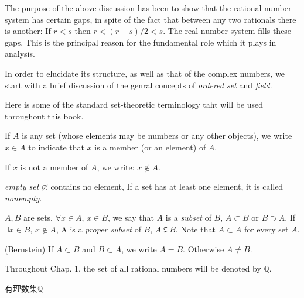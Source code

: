 \begin{myRemark}\label{Remark:1.2}
The purpose of the above discussion has been to show that the rational number system has certain gaps, 
in spite of the fact that between any two rationals there is another: If $r<s$ then $r<(r+s)/2<s$.
The real number system fills these gaps.
This is the principal reason for the fundamental role which it plays in analysis.
\end{myRemark}


In order to elucidate its structure, as well as that of the complex numbers, 
we start with a brief discussion of the genral concepts of \emph{ordered set} and \emph{field}.



Here is some of the standard set-theoretic terminology taht will be used throughout this book.


\begin{myDef}\label{myDef:1.3}
If $A$ is any set (whose elements may be numbers or any other objects), we write $x\in A$ to indicate that $x$ is a member (or an element) of $A$.


If $x$ is not a member of $A$, we write: $x\notin A$.

\emph{empty set} $\varnothing$ contains no element, If a set has at least one element, it is called \emph{nonempty}.

$A,B$ are sets, $\forall x\in A$, $x\in B$, we say that $A$ is a \emph{subset} of $B$, $A\subset B$ or $B\supset A$. If $\exists x\in B$, $x\notin A$, A is a \emph{proper subset} of $B$, $A \subsetneqq B$.
Note that $A\subset A$ for every set $A$.

(Bernstein) If $A\subset B$ and $B\subset A$, we write $A = B$. Otherwise $A\neq B$.
\end{myDef}

\begin{myDef}\label{myDef:1.4}
Throughout Chap. 1, the set of all rational numbers will be denoted by $\mathbb{Q}$.
\end{myDef}

有理数集$\mathbb{Q}$

